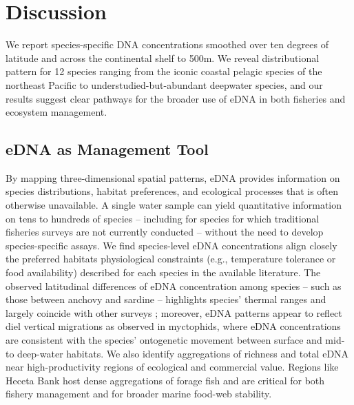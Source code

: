 \documentclass[9pt,twocolumn,twoside]{pnas-new}
\begin{document}


\section*{Discussion}
We report species-specific DNA concentrations smoothed over ten degrees of latitude and across the continental shelf to 500m. We reveal distributional pattern for 12 species ranging from the iconic coastal pelagic species of the northeast Pacific to understudied-but-abundant deepwater species, and our results suggest clear pathways for the broader use of eDNA in both fisheries and ecosystem management.

\subsection*{eDNA as Management Tool}
By mapping three-dimensional spatial patterns, eDNA provides information on species distributions, habitat preferences, and ecological processes that is often otherwise unavailable. A single water sample can yield quantitative information on tens to hundreds of species – including for species for which traditional fisheries surveys are not currently conducted – without the need to develop species-specific assays. We find species-level eDNA concentrations align closely the preferred habitats physiological constraints (e.g., temperature tolerance or food availability) described for each species in the available literature. The observed latitudinal differences of eDNA concentration among species – such as those between anchovy and sardine – highlights species’ thermal ranges and largely coincide with other surveys \cite{zwolinski2024}; moreover, eDNA patterns appear to reflect diel vertical migrations as observed in myctophids, where eDNA concentrations are consistent with the species’ ontogenetic movement between surface and mid- to deep-water habitats. We also identify aggregations of richness and total eDNA near high-productivity regions of ecological and commercial value. Regions like Heceta Bank host dense aggregations of forage fish and are critical for both fishery management and for broader marine food-web stability. 
\end{document}
